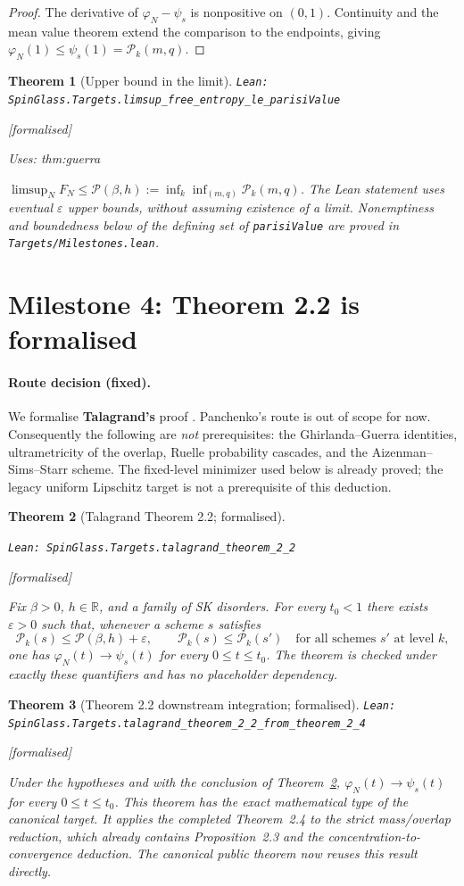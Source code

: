 \documentclass[11pt]{article}
\providecommand{\lean}[1]{\leavevmode\par\nopagebreak
  {\noindent\normalfont\footnotesize\raggedright\texttt{Lean: #1}\par}\nopagebreak}
\providecommand{\leanok}{\par\nopagebreak
  {\noindent\normalfont\footnotesize\textcolor{green!50!black}{[formalised]}\par}\nopagebreak}
\providecommand{\uses}[1]{\par\nopagebreak
  {\noindent\normalfont\footnotesize Uses: #1\par}\nopagebreak}
\newtheorem{theorem}{Theorem}[section]
\newcommand{\R}{\mathbb{R}}
\begin{document}
\begin{proof}
The derivative of $\varphi_N-\psi_s$ is nonpositive on $(0,1)$.
Continuity and the mean value theorem extend the comparison to the endpoints,
giving $\varphi_N(1)\le\psi_s(1)=\mathcal P_k(m,q)$.
\end{proof}

\begin{theorem}[Upper bound in the limit]
\lean{SpinGlass.Targets.limsup\_free\_entropy\_le\_parisiValue}\leanok
\uses{thm:guerra}
$\limsup_N F_N\le\mathcal P(\beta,h):=\inf_k\inf_{(m,q)}\mathcal P_k(m,q)$.
The Lean statement uses eventual $\varepsilon$ upper bounds, without assuming
existence of a limit. Nonemptiness and boundedness below of the defining set of
\texttt{parisiValue} are proved in \texttt{Targets/Milestones.lean}.
\end{theorem}

\section{Milestone 4: Theorem 2.2 is formalised}

\paragraph{Route decision (fixed).}  We formalise \textbf{Talagrand's} proof
\cite{Tal06}.  Panchenko's route \cite{Pan13} is out of scope for now.  Consequently the
following are \emph{not} prerequisites: the Ghirlanda--Guerra identities, ultrametricity of
the overlap, Ruelle probability cascades, and the Aizenman--Sims--Starr scheme.
The fixed-level minimizer used below is already proved; the legacy uniform
Lipschitz target is not a prerequisite of this deduction.

\begin{theorem}[Talagrand Theorem 2.2; formalised]\label{thm:two-two}
\lean{SpinGlass.Targets.talagrand\_theorem\_2\_2}\leanok
Fix $\beta>0$, $h\in\R$, and a family of SK disorders. For every $t_0<1$ there
exists $\varepsilon>0$ such that, whenever a scheme $s$ satisfies
\[
\mathcal P_k(s)\le\mathcal P(\beta,h)+\varepsilon,
\qquad \mathcal P_k(s)\le\mathcal P_k(s')\quad\text{for all schemes $s'$ at level $k$},
\]
one has $\varphi_N(t)\to\psi_s(t)$ for every $0\le t\le t_0$.
The theorem is checked under exactly these quantifiers and has no placeholder
dependency.
\end{theorem}

\begin{theorem}[Theorem 2.2 downstream integration; formalised]
\lean{SpinGlass.Targets.talagrand\_theorem\_2\_2\_from\_theorem\_2\_4}\leanok
Under the hypotheses and with the conclusion of Theorem~\ref{thm:two-two},
$\varphi_N(t)\to\psi_s(t)$ for every $0\le t\le t_0$. This theorem has the exact
mathematical type of the canonical target. It applies the completed Theorem~2.4
to the strict mass/overlap reduction, which already contains Proposition~2.3 and
the concentration-to-convergence deduction. The canonical public theorem now
reuses this result directly.
\end{theorem}
\end{document}
